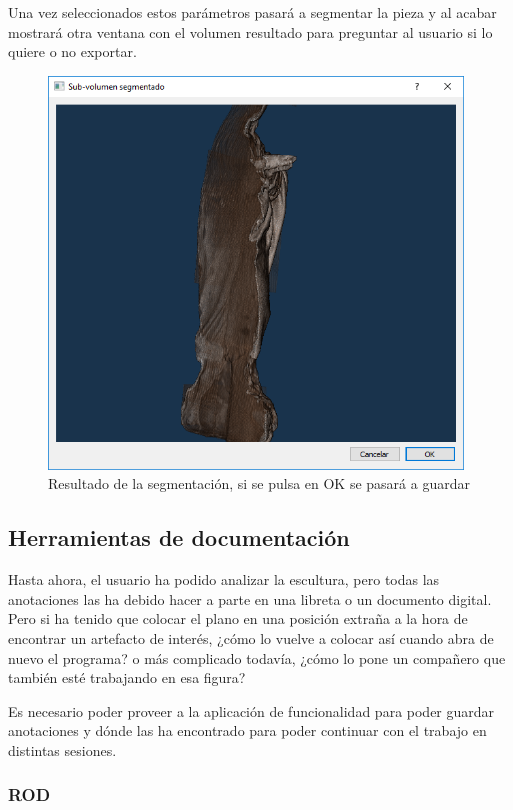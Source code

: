 Una vez seleccionados estos parámetros pasará a segmentar la pieza y al acabar mostrará otra ventana con el volumen resultado para preguntar al usuario si lo quiere o no exportar.

\begin{figure}[H]
	\centering
	\includegraphics[width=11cm]{imagenes/desarrollo/gui-segmentacion-resultado}
	\caption{Resultado de la segmentación, si se pulsa en OK se pasará a guardar}
	\label{fig:desarrollo/gui-segmentacion-resultado}
\end{figure}

\subsection{Herramientas de documentación}

Hasta ahora, el usuario ha podido analizar la escultura, pero todas las anotaciones las ha debido hacer a parte en una libreta o un documento digital. Pero si ha tenido que colocar el plano en una posición extraña a la hora de encontrar un artefacto de interés, ¿cómo lo vuelve a colocar así cuando abra de nuevo el programa? o más complicado todavía, ¿cómo lo pone un compañero que también esté trabajando en esa figura?

Es necesario poder proveer a la aplicación de funcionalidad para poder guardar anotaciones y dónde las ha encontrado para poder continuar con el trabajo en distintas sesiones.

\subsubsection{ROD}

